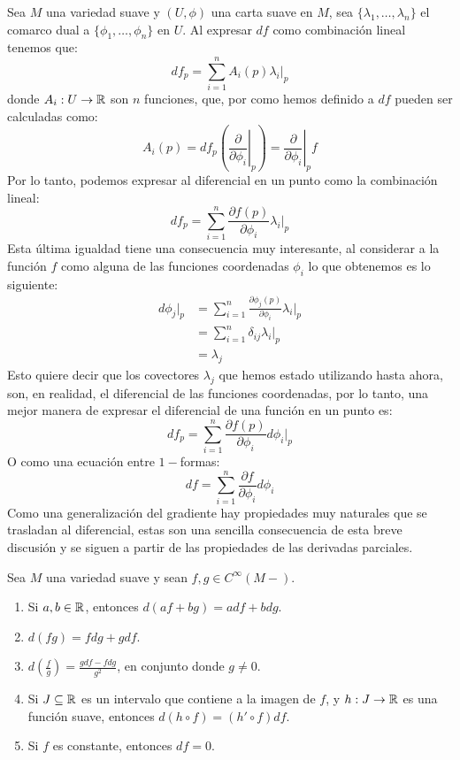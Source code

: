 Sea $M$ una variedad suave y $(U,\phi)$ una carta suave en $M$, sea $\{\lambda_1, \ldots, \lambda_n\}$ el comarco dual a $\{\phi_1,\ldots, \phi_n\}$ en $U$. Al expresar $df$ como combinación lineal tenemos que:\[
	df_p = \sum_{i=1}^n A_i(p) \lambda_i |_p
\]
donde $A_i: U \to \mathbb{R}$ son $n$ funciones, que, por como hemos definido a $df$ pueden ser calculadas como:
\[
	A_i(p)
	= df_p \left( \left. \frac{\partial}{\partial \phi_i} \right|_{p}\right)
	= \left. \frac{\partial}{\partial \phi_i} \right|_{p} f
\]
Por lo tanto, podemos expresar al diferencial en un punto como la combinación lineal:
\[
	df_p = \sum_{i=1}^n \frac{\partial f(p)}{\partial \phi_i} \lambda_i|_p
\]
Esta última igualdad tiene una consecuencia muy interesante, al considerar a la función $f$ como alguna de las funciones coordenadas $\phi_i$ lo que obtenemos es lo siguiente:
\begin{align*}
	d\phi_j|_p
	 & = \sum_{i=1}^n \frac{\partial \phi_j(p)}{\partial \phi_i} \lambda_i |_p \\
	 & = \sum_{i=1}^n \delta_{ij} \lambda_i|_p                                 \\
	 & = \lambda_j
\end{align*}
Esto quiere decir que los covectores $\lambda_j$ que hemos estado utilizando hasta ahora, son, en realidad, el diferencial de las funciones coordenadas, por lo tanto, una mejor manera de expresar el diferencial de una función en un punto es:
\[
	df_p = \sum_{i=1}^n \frac{\partial f(p)}{\partial \phi_i} d\phi_i |_p
\]
O como una ecuación entre $1-$formas:
\[
	df = \sum_{i=1}^n \frac{\partial f}{\partial \phi_i} d\phi_i
\]
Como una generalización del gradiente hay propiedades muy naturales que se trasladan al diferencial, estas son una sencilla consecuencia de esta breve discusión y se siguen a partir de las propiedades de las derivadas parciales.
\begin{corollary}
	Sea $M$ una variedad suave y sean $f,g \in C^{\infty}(M-)$.
	\begin{enumerate}
		\item Si $a,b \in \mathbb{R}$, entonces $d(af+bg) = adf + bdg$.
		\item $d(fg) = fdg + gdf$.
		\item $d(\frac{f}{g}) = \frac{gdf - fdg}{g^2}$, en conjunto donde $g \neq 0$.
		\item Si $J \subseteq \mathbb{R}$ es un intervalo que contiene a la imagen de $f$, y $h: J \to \mathbb{R}$ es una función suave, entonces $d(h \circ f) = (h' \circ f)df$.
		\item Si $f$ es constante, entonces $df = 0$.
	\end{enumerate}
\end{corollary}

